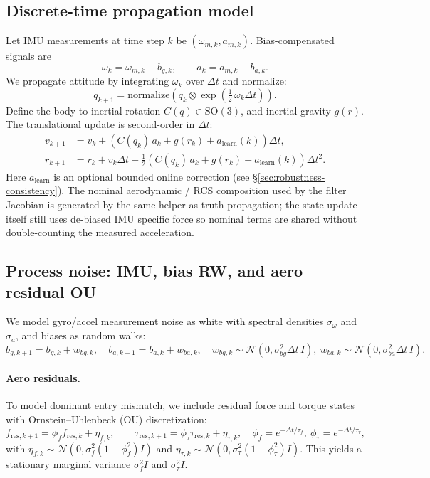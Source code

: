 \documentclass[10pt]{article}
\newcommand{\calN}{\mathcal{N}}
\begin{document}
\subsection{Discrete-time propagation model}
Let IMU measurements at time step $k$ be $(\omega_{m,k}, a_{m,k})$.
Bias-compensated signals are
\begin{equation}
  \omega_k = \omega_{m,k} - b_{g,k},\qquad
  a_k = a_{m,k} - b_{a,k}.
\end{equation}
We propagate attitude by integrating $\omega_k$ over $\Delta t$ and normalize:
\begin{equation}
  q_{k+1} = \mathrm{normalize}\!\left( q_k \otimes \exp(\tfrac{1}{2}\,\omega_k \Delta t) \right).
\end{equation}
Define the body-to-inertial rotation $C(q)\in \mathrm{SO}(3)$, and inertial gravity $g(r)$.
The translational update is second-order in $\Delta t$:
\begin{align}
  v_{k+1} &= v_k + \left( C(q_k)\,a_k + g(r_k) + a_{\text{learn}}(k)\right)\Delta t,\\
  r_{k+1} &= r_k + v_k \Delta t + \tfrac{1}{2}\left( C(q_k)\,a_k + g(r_k) + a_{\text{learn}}(k)\right)\Delta t^2.
\end{align}
Here $a_{\text{learn}}$ is an optional bounded online correction (see \S\ref{sec:robustness-consistency}).
The nominal aerodynamic / RCS composition used by the filter Jacobian is generated by the same helper as truth propagation; the state update itself still uses de-biased IMU specific force so nominal terms are shared without double-counting the measured acceleration.

\subsection{Process noise: IMU, bias RW, and aero residual OU}
We model gyro/accel measurement noise as white with spectral densities
$\sigma_\omega$ and $\sigma_a$, and biases as random walks:
\begin{equation}
  b_{g,k+1} = b_{g,k} + w_{bg,k},\quad
  b_{a,k+1} = b_{a,k} + w_{ba,k},\quad
  w_{bg,k}\sim \calN(0,\sigma_{bg}^2 \Delta t\,I),\ w_{ba,k}\sim \calN(0,\sigma_{ba}^2 \Delta t\,I).
\end{equation}
\paragraph{Aero residuals.}
To model dominant entry mismatch, we include residual force and torque states
with Ornstein--Uhlenbeck (OU) discretization:
\begin{equation}
  f_{\text{res},k+1} = \phi_f f_{\text{res},k} + \eta_{f,k},\qquad
  \tau_{\text{res},k+1} = \phi_\tau \tau_{\text{res},k} + \eta_{\tau,k},
  \quad \phi_f=e^{-\Delta t/\tau_f},\ \phi_\tau=e^{-\Delta t/\tau_\tau},
\end{equation}
with $\eta_{f,k}\sim\calN(0,\sigma_f^2(1-\phi_f^2)I)$ and $\eta_{\tau,k}\sim\calN(0,\sigma_\tau^2(1-\phi_\tau^2)I)$.
This yields a stationary marginal variance $\sigma_f^2 I$ and $\sigma_\tau^2 I$.
\end{document}
